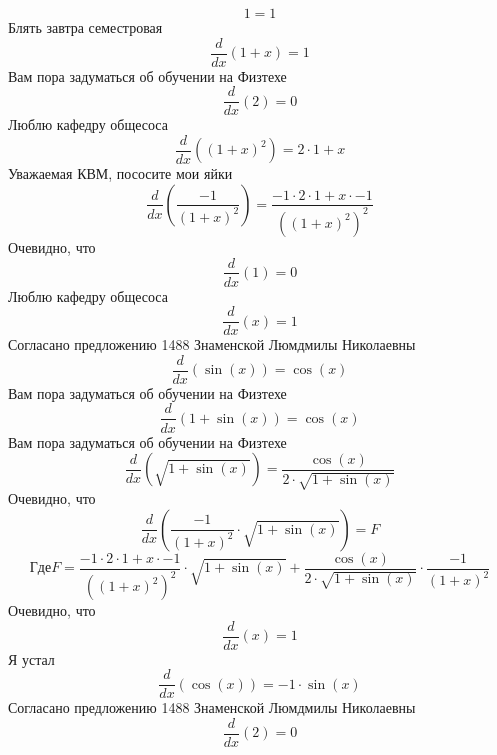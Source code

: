 \documentclass[12pt, a4paper]{article}
\begin{document}
\begin{equation}
1 = 1
\end{equation}
Блять завтра семестровая
\begin{equation}
\frac{d}{dx}(1+x) = 1
\end{equation}
Вам пора задуматься об обучении на Физтехе
\begin{equation}
\frac{d}{dx}(2) = 0
\end{equation}
Люблю кафедру общесоса
\begin{equation}
\frac{d}{dx}({(1+x)}^{2}) = 2 \cdot 1+x
\end{equation}
Уважаемая КВМ, пососите мои яйки
\begin{equation}
\frac{d}{dx}(\frac{-1}{{(1+x)}^{2}}) = \frac{-1 \cdot 2 \cdot 1+x \cdot -1}{{({(1+x)}^{2})}^{2}}
\end{equation}
Очевидно, что
\begin{equation}
\frac{d}{dx}(1) = 0
\end{equation}
Люблю кафедру общесоса
\begin{equation}
\frac{d}{dx}(x) = 1
\end{equation}
Согласано предложению 1488 Знаменской Люмдмилы Николаевны
\begin{equation}
\frac{d}{dx}(\sin(x)) = \cos(x)
\end{equation}
Вам пора задуматься об обучении на Физтехе
\begin{equation}
\frac{d}{dx}(1+\sin(x)) = \cos(x)
\end{equation}
Вам пора задуматься об обучении на Физтехе
\begin{equation}
\frac{d}{dx}(\sqrt{1+\sin(x)}) = \frac{\cos(x)}{2 \cdot \sqrt{1+\sin(x)}}
\end{equation}
Очевидно, что
\begin{equation}
\frac{d}{dx}(\frac{-1}{{(1+x)}^{2}} \cdot \sqrt{1+\sin(x)}) = F
\end{equation}
$$Где F = \frac{-1 \cdot 2 \cdot 1+x \cdot -1}{{({(1+x)}^{2})}^{2}} \cdot \sqrt{1+\sin(x)}+\frac{\cos(x)}{2 \cdot \sqrt{1+\sin(x)}} \cdot \frac{-1}{{(1+x)}^{2}}$$
Очевидно, что
\begin{equation}
\frac{d}{dx}(x) = 1
\end{equation}
Я устал
\begin{equation}
\frac{d}{dx}(\cos(x)) = -1 \cdot \sin(x)
\end{equation}
Согласано предложению 1488 Знаменской Люмдмилы Николаевны
\begin{equation}
\frac{d}{dx}(2) = 0
\end{equation}
\end{document}
